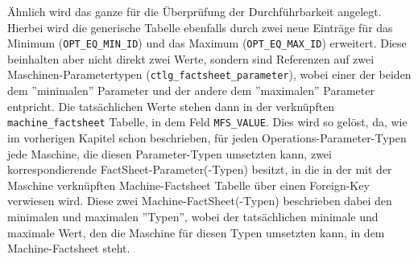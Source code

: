 Ähnlich wird das ganze für die Überprüfung der Durchführbarkeit angelegt. Hierbei wird die generische Tabelle ebenfalls durch zwei neue Einträge für das Minimum (\texttt{OPT\_EQ\_MIN\_ID}) und das Maximum (\texttt{OPT\_EQ\_MAX\_ID}) erweitert. Diese beinhalten aber nicht direkt zwei Werte, sondern sind Referenzen auf zwei Maschinen-Parametertypen (\texttt{ctlg\_factsheet\_parameter}), wobei einer der beiden dem ''minimalen'' Parameter und der andere dem ''maximalen'' Parameter entpricht. Die tatsächlichen Werte stehen dann in der verknüpften \texttt{machine\_factsheet} Tabelle, in dem Feld \texttt{MFS\_VALUE}. Dies wird so gelöst, da, wie im vorherigen Kapitel schon beschrieben, für jeden Operations-Parameter-Typen jede Maschine, die diesen Parameter-Typen umsetzten kann, zwei korrespondierende FactSheet-Parameter(-Typen) besitzt, in die in der mit der Maschine verknüpften Machine-Factsheet Tabelle über einen Foreign-Key verwiesen wird. Diese zwei Machine-FactSheet(-Typen) beschrieben dabei den minimalen und maximalen ''Typen'', wobei der tatsächlichen minimale und maximale Wert, den die Maschine für diesen Typen umsetzten kann, in dem Machine-Factsheet steht.

